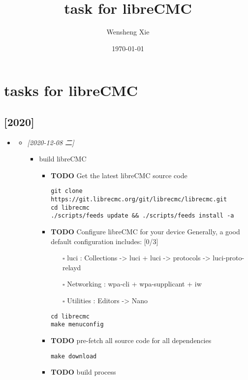 \documentclass[a4paper]{report}
\author{Wensheng Xie}
\date{\today}
\title{task for libreCMC}
\begin{document}
\maketitle

\part*{tasks for libreCMC}
\label{sec:orgd6601a3}
\chapter*{[2020]}
\label{sec:org0a835e1}
\begin{itemize}
\item\relax [2020-12]
\label{sec:org82a23e9}
\begin{itemize}
\item \textit{[2020-12-08 二]}
\label{sec:orgdf8288d}
\begin{itemize}
\item build libreCMC
\label{sec:org45ca44c}
\begin{itemize}
\item {\bfseries\sffamily TODO} Get the latest libreCMC source code
\label{sec:orgf0644a4}
\begin{verbatim}
git clone https://git.librecmc.org/git/librecmc/librecmc.git
cd librecmc
./scripts/feeds update && ./scripts/feeds install -a
\end{verbatim}
\item {\bfseries\sffamily TODO} Configure libreCMC for your device
\label{sec:org884f6d6}
Generally, a good default configuration includes: [0/3]
\begin{itemize}
\item[{$\square$}] luci : Collections -> luci + luci -> protocols -> luci-proto-relayd
\item[{$\square$}] Networking : wpa-cli + wpa-supplicant + iw
\item[{$\square$}] Utilities : Editors -> Nano
\end{itemize}
\begin{verbatim}
cd librecmc
make menuconfig
\end{verbatim}
\item {\bfseries\sffamily TODO} pre-fetch all source code for all dependencies
\label{sec:org4ab13ec}
\begin{verbatim}
make download
\end{verbatim}
\item {\bfseries\sffamily TODO} build process
\label{sec:org412b4e4}

\end{itemize}
\end{itemize}
\end{itemize}
\end{itemize}
\end{document}
